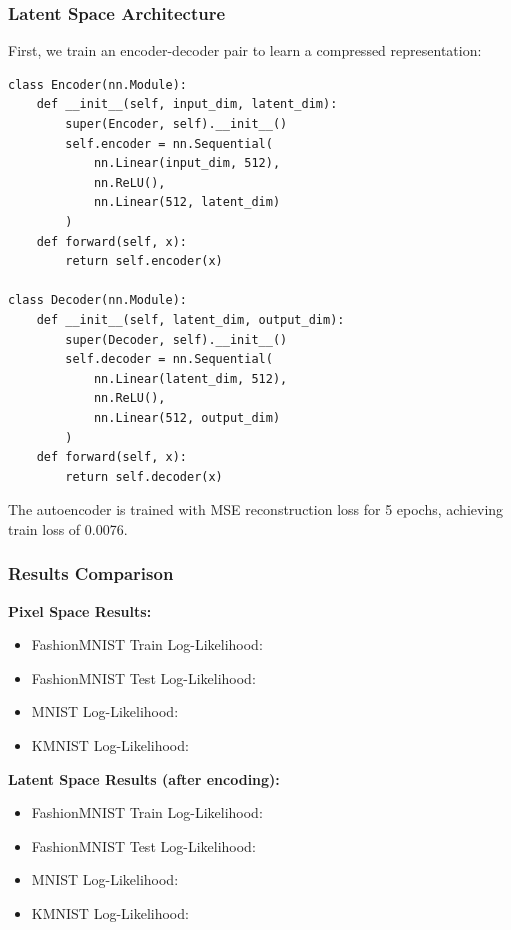 \documentclass[conference,12pt]{IEEEtran}
\begin{document}
\subsubsection{Latent Space Architecture}

First, we train an encoder-decoder pair to learn a compressed representation:

\begin{lstlisting}[caption={Encoder and Decoder Architecture}]
class Encoder(nn.Module):
    def __init__(self, input_dim, latent_dim):
        super(Encoder, self).__init__()
        self.encoder = nn.Sequential(
            nn.Linear(input_dim, 512),
            nn.ReLU(),
            nn.Linear(512, latent_dim)
        )
    def forward(self, x):
        return self.encoder(x)

class Decoder(nn.Module):
    def __init__(self, latent_dim, output_dim):
        super(Decoder, self).__init__()
        self.decoder = nn.Sequential(
            nn.Linear(latent_dim, 512),
            nn.ReLU(),
            nn.Linear(512, output_dim)
        )
    def forward(self, x):
        return self.decoder(x)
\end{lstlisting}

The autoencoder is trained with MSE reconstruction loss for 5 epochs, achieving train loss of 0.0076.

\subsubsection{Results Comparison}

\textbf{Pixel Space Results:}
\begin{itemize}
    \item FashionMNIST Train Log-Likelihood: \PixelTrainLL
    \item FashionMNIST Test Log-Likelihood: \PixelTestLL
    \item MNIST Log-Likelihood: \PixelMNISTLL
    \item KMNIST Log-Likelihood: \PixelKMNISTLL
\end{itemize}

\textbf{Latent Space Results (after encoding):}
\begin{itemize}
    \item FashionMNIST Train Log-Likelihood: \LatentTrainLL
    \item FashionMNIST Test Log-Likelihood: \LatentTestLL
    \item MNIST Log-Likelihood: \LatentMNISTLL
    \item KMNIST Log-Likelihood: \LatentKMNISTLL
\end{itemize}
\end{document}
